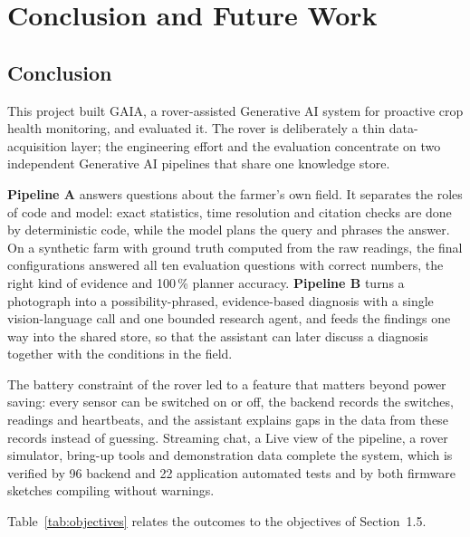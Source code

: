 \chapter{Conclusion and Future Work}

\section{Conclusion}

This project built GAIA, a rover-assisted Generative AI system for proactive crop health monitoring, and evaluated it. The rover is
deliberately a thin data-acquisition layer; the engineering effort and the evaluation concentrate on two independent Generative AI
pipelines that share one knowledge store.

\textbf{Pipeline A} answers questions about the farmer's own field. It separates the roles of code and model: exact statistics, time
resolution and citation checks are done by deterministic code, while the model plans the query and phrases the answer. On a synthetic farm with ground truth
computed from the raw readings, the final configurations answered all ten evaluation questions with correct numbers, the right kind of evidence
and 100\,\% planner accuracy. \textbf{Pipeline B} turns a photograph into a possibility-phrased, evidence-based diagnosis with a single vision-language call and
one bounded research agent, and feeds the findings one way into the shared store, so that the assistant can later discuss a
diagnosis together with the conditions in the field.

The battery constraint of the rover led to a feature that matters beyond power saving: every sensor can be switched on or off,
the backend records the switches, readings and heartbeats, and the assistant explains gaps in the data from these records instead of guessing.
Streaming chat, a Live view of the pipeline, a rover simulator, bring-up tools and demonstration data complete the system, which is verified by
96 backend and 22 application automated tests and by both firmware sketches compiling without warnings.

Table~\ref{tab:objectives} relates the outcomes to the objectives of Section~1.5.

